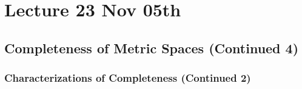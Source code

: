 \documentclass[notoc,notitlepage]{tufte-book}
\begin{document}



\chapter{Lecture 23 Nov 05th}%
\label{chp:lecture_23_nov_05th}

\section{Completeness of Metric Spaces (Continued 4)}%
\label{sec:completeness_of_metric_spaces_continued_4}

\subsection{Characterizations of Completeness (Continued 2)}%
\label{sub:characterizations_of_completeness_continued_2}
\end{document}
